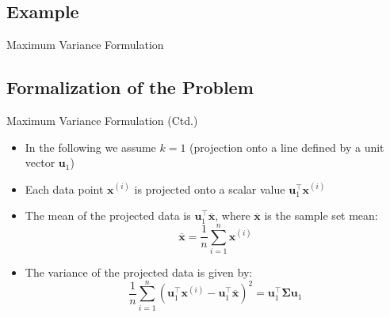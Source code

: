 \subsection{Example}

\begin{frame}{Maximum Variance Formulation}{}
	
\end{frame}


\subsection{Formalization of the Problem}

\begin{frame}{Maximum Variance Formulation (Ctd.)}{}
	\begin{itemize}
		\item In the following we assume $k = 1$ {\footnotesize (projection onto a line defined by a unit vector $\bm{u}_1$)}
		\item Each data point $\bm{x}^{(i)}$ is projected onto a scalar value $\bm{u}_1^{\intercal} \bm{x}^{(i)}$
		\item The mean of the projected data is $\bm{u}_1^{\intercal} \overline{\bm{x}}$, where $\overline{\bm{x}}$
			is the sample set mean:
		\begin{equation}
			\overline{\bm{x}} = \frac{1}{n} \sum_{i=1}^n \bm{x}^{(i)}
		\end{equation}
		\item The variance of the projected data is given by:
		\begin{equation}
			\frac{1}{n} \sum_{i=1}^n \left( \bm{u}_1^{\intercal} \bm{x}^{(i)} -
				\bm{u}_1^{\intercal} \overline{\bm{x}} \right)^2 = \bm{u}_1^{\intercal} \bm{\Sigma} \bm{u}_1
		\end{equation}
	\end{itemize}
\end{frame}


